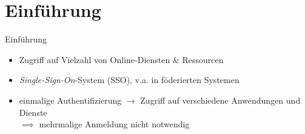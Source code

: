 
{
    \section{Einführung}
}

\begin{frame}{Einführung}
    \begin{itemize}
        \item Zugriff auf Vielzahl von Online-Diensten \& Ressourcen
        \item \emph{Single-Sign-On}-System (SSO), v.a. in föderierten Systemen
        \item \alert{einmalige} Authentifizierung $\to$ Zugriff auf verschiedene Anwendungen und Dienste \\
            $\implies$ mehrmalige Anmeldung nicht notwendig \cite{switchIntroductionSWITCHaai2024}
    \end{itemize}
\end{frame}


